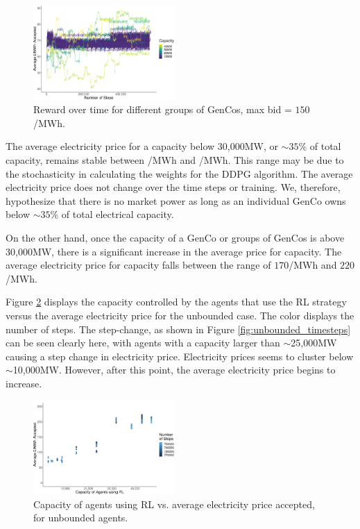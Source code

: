 \documentclass[conference]{IEEEtran}
\begin{document}
\begin{figure}[htbp]
    \includegraphics[width=0.48\textwidth]{figures/results/bounded_results.pdf}
    \caption{Reward over time for different groups of GenCos, max bid = \textsterling $150$/MWh.}
    \label{fig:bounded_timesteps}
\end{figure}



The average electricity price for a capacity below 30,000MW, or ${\sim35\%}$ of total capacity, remains stable between /MWh and /MWh. This range may be due to the stochasticity in calculating the weights for the DDPG algorithm. The average electricity price does not change over the time steps or training. We, therefore, hypothesize that there is no market power as long as an individual GenCo owns below ${\sim}35\%$ of total electrical capacity. 

On the other hand, once the capacity of a GenCo or groups of GenCos is above 30,000MW, there is a significant increase in the average price for capacity. The average electricity price for capacity falls between the range of  \textsterling$170$/MWh and \textsterling$220$/MWh. 

Figure \ref{fig:unbounded_results_scatter} displays the capacity controlled by the agents that use the RL strategy versus the average electricity price for the unbounded case. The color displays the number of steps. The step-change, as shown in Figure \ref{fig:unbounded_timesteps} can be seen clearly here, with agents with a capacity larger than ${\sim}$25,000MW causing a step change in electricity price. Electricity prices seems to cluster below ${\sim}$10,000MW. However, after this point, the average electricity price begins to increase.



\begin{figure}[]
    \includegraphics[width=0.48\textwidth]{figures/results/unbounded_results_scatter.pdf}
    \caption{Capacity of agents using RL vs. average electricity price accepted, for unbounded agents.}
    \label{fig:unbounded_results_scatter}
\end{figure}
\end{document}
